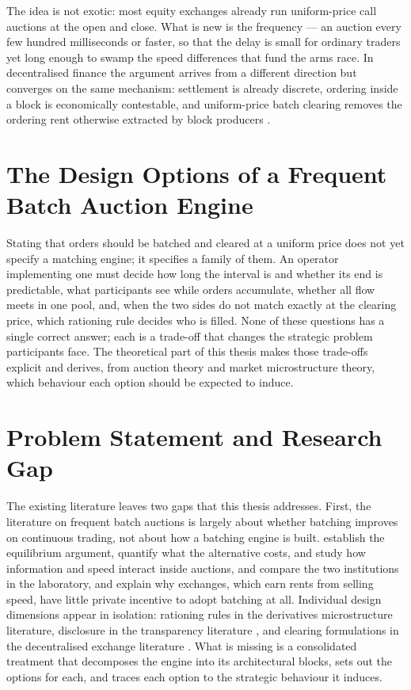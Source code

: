 The idea is not exotic: most equity exchanges already run uniform-price
call auctions at the open and close. What is new is the frequency --- an
auction every few hundred milliseconds or faster, so that the delay is
small for ordinary traders yet long enough to swamp the speed differences
that fund the arms race. In decentralised finance the argument arrives
from a different direction but converges on the same mechanism: settlement
is already discrete, ordering inside a block is economically contestable,
and uniform-price batch clearing removes the ordering rent otherwise
extracted by block producers
\citep{daian2020flash,gong2023fbadex,walther2021multitoken,dutta2025cow}.

\section{The Design Options of a Frequent Batch Auction Engine}
\label{sec:designproblem}

Stating that orders should be batched and cleared at a uniform price does
not yet specify a matching engine; it specifies a family of them. An
operator implementing one must decide how long the interval is and whether
its end is predictable, what participants see while orders accumulate,
whether all flow meets in one pool, and, when the two sides do not match
exactly at the clearing price, which rationing rule decides who is filled.
None of these questions has a single correct answer; each is a trade-off
that changes the strategic problem participants face. The theoretical part
of this thesis makes those trade-offs explicit and derives, from auction
theory and market microstructure theory, which behaviour each option should
be expected to induce.

\section{Problem Statement and Research Gap}
\label{sec:gap}

The existing literature leaves two gaps that this thesis addresses.
First, the literature on frequent batch auctions is largely about whether
batching improves on continuous trading, not about how a batching engine
is built.
\citet{budish2015hft} establish the equilibrium argument,
\citet{aquilina2022quantifying} quantify what the alternative costs,
\citet{zoican2021speed} and \citet{eibelshauser2022fba} study how
information and speed interact inside auctions, and
\citet{aldrich2020experiments} compare the two institutions in the
laboratory, and \citet{budish2024competition} explain why exchanges, which
earn rents from selling speed, have little private incentive to adopt
batching at all. Individual design dimensions appear in isolation: rationing
rules in the derivatives microstructure literature, disclosure in the
transparency literature \citep{madhavan1996transparency}, and clearing
formulations in the decentralised exchange literature
\citep{walther2021multitoken,ramsay2023speedex}. What is missing is a
consolidated treatment that decomposes the engine into its architectural
blocks, sets out the options for each, and traces each option to the
strategic behaviour it induces.

